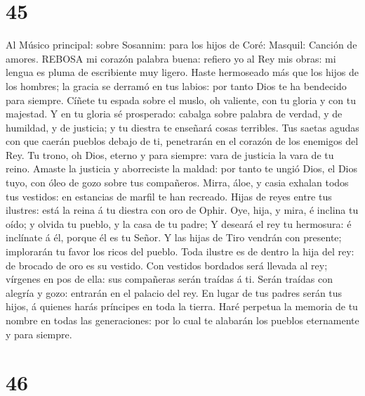 \hypertarget{section-44}{%
\section{45}\label{section-44}}

 Al Músico principal: sobre Sosannim: para los hijos de
Coré: Masquil: Canción de amores. REBOSA mi corazón palabra buena:
refiero yo al Rey mis obras: mi lengua es pluma de escribiente muy
ligero.  Haste hermoseado más que los hijos de los hombres;
la gracia se derramó en tus labios: por tanto Dios te ha bendecido para
siempre.  Cíñete tu espada sobre el muslo, oh valiente, con
tu gloria y con tu majestad.  Y en tu gloria sé prosperado:
cabalga sobre palabra de verdad, y de humildad, y de justicia; y tu
diestra te enseñará cosas terribles.  Tus saetas agudas con
que caerán pueblos debajo de ti, penetrarán en el corazón de los
enemigos del Rey.  Tu trono, oh Dios, eterno y para siempre:
vara de justicia la vara de tu reino.  Amaste la justicia y
aborreciste la maldad: por tanto te ungió Dios, el Dios tuyo, con óleo
de gozo sobre tus compañeros.  Mirra, áloe, y casia exhalan
todos tus vestidos: en estancias de marfil te han recreado. 
Hijas de reyes entre tus ilustres: está la reina á tu diestra con oro de
Ophir.  Oye, hija, y mira, é inclina tu oído; y olvida tu
pueblo, y la casa de tu padre;  Y deseará el rey tu
hermosura: é inclínate á él, porque él es tu Señor.  Y las
hijas de Tiro vendrán con presente; implorarán tu favor los ricos del
pueblo.  Toda ilustre es de dentro la hija del rey: de
brocado de oro es su vestido.  Con vestidos bordados será
llevada al rey; vírgenes en pos de ella: sus compañeras serán traídas á
ti.  Serán traídas con alegría y gozo: entrarán en el
palacio del rey.  En lugar de tus padres serán tus hijos, á
quienes harás príncipes en toda la tierra.  Haré perpetua
la memoria de tu nombre en todas las generaciones: por lo cual te
alabarán los pueblos eternamente y para siempre.

\hypertarget{section-45}{%
\section{46}\label{section-45}}


